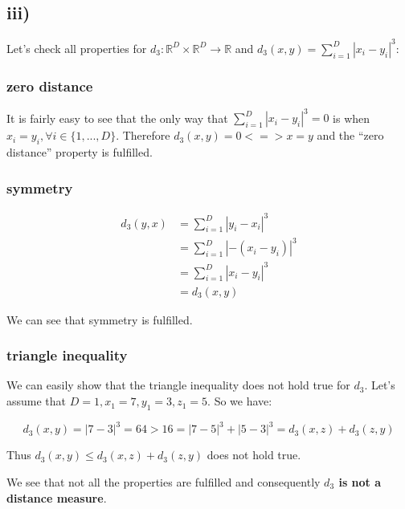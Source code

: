 
\subsection*{iii)} %
\label{sub:iii}

Let's check all properties for $d_3: \mathbb{R}^D \times \mathbb{R}^D \to \mathbb{R}$
and $d_3(x,y) = \sum_{i=1}^{D}|x_{i}-y_{i}|^3$:

\subsubsection*{zero distance} %
\label{ssub:zero_distance}
It is fairly easy to see that the only way that $\sum_{i=1}^{D}|x_{i}-y_{i}|^3 = 0$ is when $x_i = y_i, \forall i \in \{1,...,D\}$.
Therefore $d_3(x,y) = 0 <=> x=y$ and the ``zero distance'' property is fulfilled. 


\subsubsection*{symmetry} %
\label{ssub:symmetry}

\begin{align}
    d_3(y,x) &= {\sum_{i=1}^{D}|y_i - x_i|^3}\\
     &= {\sum_{i=1}^{D}|-(x_i - y_i)|^3}\\
     &= {\sum_{i=1}^{D}|x_i - y_i|^3}\\
     &= d_3(x,y)
\end{align}

We can see that symmetry is fulfilled.


\subsubsection*{triangle inequality} %
\label{ssub:triangle_inequality}

We can easily show that the triangle inequality does not hold true for $d_3$.
Let's assume that $D=1, x_1 = 7, y_1 = 3, z_1 = 5$.
So we have:

\[
d_3(x,y)= |7 - 3|^3 = 64 > 16 = |7-5|^3 + |5-3|^3 = d_3(x,z) + d_3(z,y)
\]

Thus $d_3(x,y) \leq d_3(x,z) + d_3(z,y)$ does not hold true. 
 
We see that not all the properties are fulfilled and consequently \textbf{$d_3$ is 
not a distance measure}.

